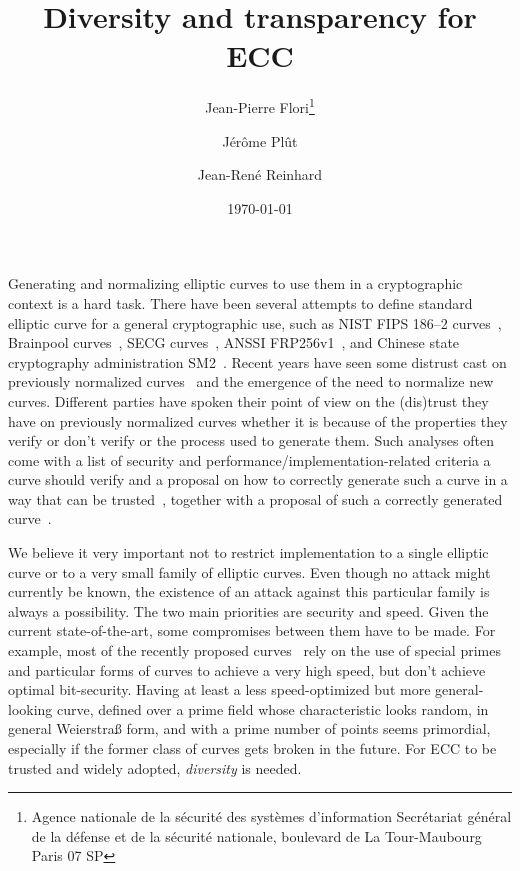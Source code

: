 \documentclass[twocolumn,letterpaper,10pt]{article}
\title{Diversity and transparency for ECC}
\author{Jean-Pierre Flori\thanks{Agence nationale de la sécurité des systèmes d'information\newline%
Secrétariat général de la défense et de la sécurité nationale\newline%
51, boulevard de La Tour-Maubourg\newline%
75700 Paris 07 SP}%
\and Jérôme Plût\footnotemark[1] \and Jean-René Reinhard\footnotemark[1]}
\date{\today}
\begin{document}
\sloppy \maketitle
Generating and normalizing elliptic curves to use them in a cryptographic
context is a hard task.
There have been several attempts to define standard elliptic curve
for a general cryptographic use,
such as NIST FIPS 186--2 curves~\cite{nist2000fips186-2},
Brainpool curves~\cite{rfc5639},
SECG curves~\cite{certicom2010sec2},
ANSSI FRP256v1~\cite{jorf2011ce},
and Chinese state cryptography administration SM2~\cite{oscca2010sm2}.
Recent years have seen some distrust cast on previously normalized
curves~\cite{rfc5639,nist2000fips186-2,jorf2011ce,oscca2010sm2}
and the emergence of the need to normalize new curves.
Different parties have spoken their point of view on the (dis)trust they have
on previously normalized curves whether it is because of
the properties they verify or don't verify
or the process used to generate them.
Such analyses often come with
a list of security and performance/implementation-related criteria
a curve should verify
and a proposal on how to correctly generate such a curve in a way that can be
trusted~\cite{safecurves,msr2014bcln,eprint2014brainpool,eprint2013abgr},
together with a proposal of such a correctly generated
curve~\cite{pkc2006bernstein,msr2014bcln,eprint2013abgr}.

\medskip
We believe it very important not to restrict implementation
to a single elliptic curve or to a very small family of elliptic curves.
Even though no attack might currently be known,
the existence of an attack against this particular family
is always a possibility.
The two main priorities are security and speed.
Given the current state-of-the-art,
some compromises between them have to be made.
For example, most of the recently proposed
curves~\cite{pkc2006bernstein,msr2014bcln,eprint2013abgr,oscca2010sm2}
rely on the use of special primes and particular forms of curves to
achieve a very high speed,
but don't achieve optimal bit-security.
Having at least a less speed-optimized but more general-looking curve,
defined over a prime field whose characteristic looks random,
in general Weierstraß form, and with a prime number of points
seems primordial,
especially if the former class of curves gets broken in the future.
For ECC to be trusted and widely adopted, \emph{diversity} is needed.
\end{document}
